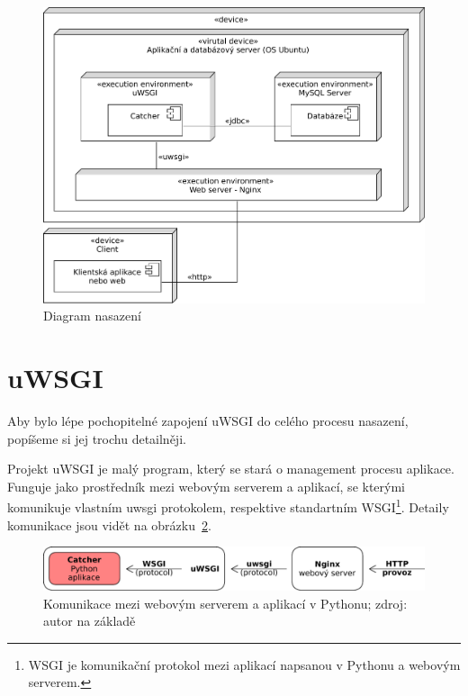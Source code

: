 \begin{figure}[ht!]
\centering
\includegraphics[width=130mm]{./images/diagram-nasazeni.pdf}
\caption{Diagram nasazení\label{overflow}}
\end{figure}

\section{uWSGI}

\indent

Aby bylo lépe pochopitelné zapojení uWSGI do celého procesu nasazení, popíšeme si jej trochu detailněji.

\medskip

Projekt uWSGI je malý program, který se stará o management procesu aplikace.
Funguje jako prostředník mezi webovým serverem a aplikací,
se kterými komunikuje vlastním uwsgi protokolem, respektive standartním WSGI\footnote{
WSGI je komunikační protokol mezi aplikací napsanou v Pythonu a webovým serverem.}.
Detaily komunikace jsou vidět na obrázku~\ref{fig:uwsgi}.

\begin{figure}[ht!]
\centering
\includegraphics[width=135mm]{./images/uwsgi.pdf}
\caption{Komunikace mezi webovým serverem a aplikací v Pythonu; zdroj: autor na základě~\cite{uwsgi}\label{overflow}}
\label{fig:uwsgi}
\end{figure}

